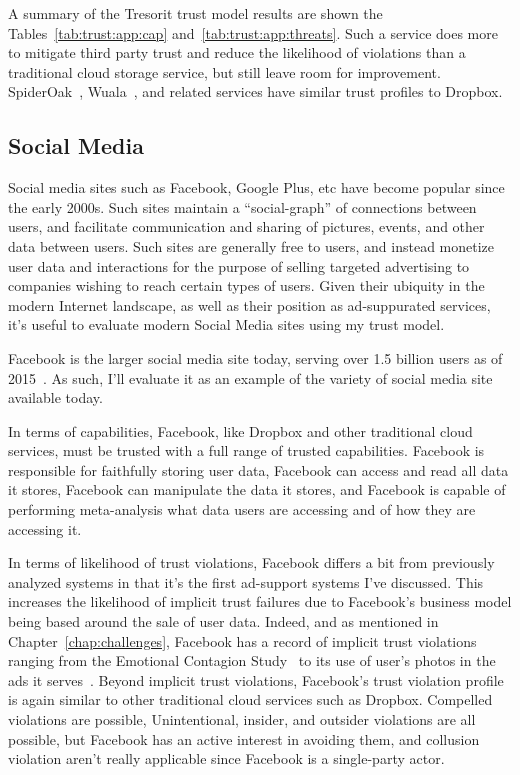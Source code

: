 A summary of the Tresorit trust model results are shown the
Tables~\ref{tab:trust:app:cap} and~\ref{tab:trust:app:threats}. Such a
service does more to mitigate third party trust and reduce the
likelihood of violations than a traditional cloud storage service, but
still leave room for improvement. SpiderOak~\cite{spideroak},
Wuala~\cite{wuala}, and related services have similar trust profiles
to Dropbox.

\subsection{Social Media}

Social media sites such as Facebook, Google Plus, etc have become
popular since the early 2000s. Such sites maintain a ``social-graph''
of connections between users, and facilitate communication and sharing
of pictures, events, and other data between users. Such sites are
generally free to users, and instead monetize user data and
interactions for the purpose of selling targeted advertising to
companies wishing to reach certain types of users. Given their
ubiquity in the modern Internet landscape, as well as their position
as ad-suppurated services, it's useful to evaluate modern Social Media
sites using my trust model.

Facebook is the larger social media site today, serving over 1.5
billion users as of 2015~\cite{foster2014}. As such, I'll evaluate it
as an example of the variety of social media site available today.

In terms of capabilities, Facebook, like Dropbox and other traditional
cloud services, must be trusted with a full range of trusted
capabilities. Facebook is responsible for faithfully storing user
data, Facebook can access and read all data it stores, Facebook can
manipulate the data it stores, and Facebook is capable of performing
meta-analysis what data users are accessing and of how they are
accessing it.

In terms of likelihood of trust violations, Facebook differs a bit
from previously analyzed systems in that it's the first ad-support
systems I've discussed. This increases the likelihood of implicit
trust failures due to Facebook's business model being based around the
sale of user data. Indeed, and as mentioned in
Chapter~\ref{chap:challenges}, Facebook has a record of implicit trust
violations ranging from the Emotional Contagion Study~\cite{goel2014}
to its use of user's photos in the ads it
serves~\cite{mashable-socialads}. Beyond implicit trust violations,
Facebook's trust violation profile is again similar to other
traditional cloud services such as Dropbox. Compelled violations are
possible, Unintentional, insider, and outsider violations are all
possible, but Facebook has an active interest in avoiding them, and
collusion violation aren't really applicable since Facebook is a
single-party actor.

